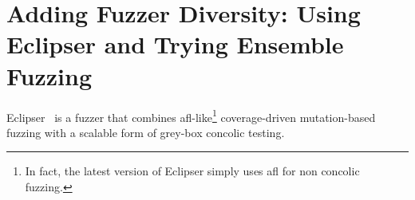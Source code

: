 \section{Adding Fuzzer Diversity: Using Eclipser and Trying Ensemble Fuzzing}

Eclipser~\cite{eclipser} is a fuzzer that combines afl-like\footnote{In fact, the latest version of Eclipser simply uses afl for non concolic fuzzing.} coverage-driven mutation-based fuzzing with a scalable form of grey-box concolic testing.